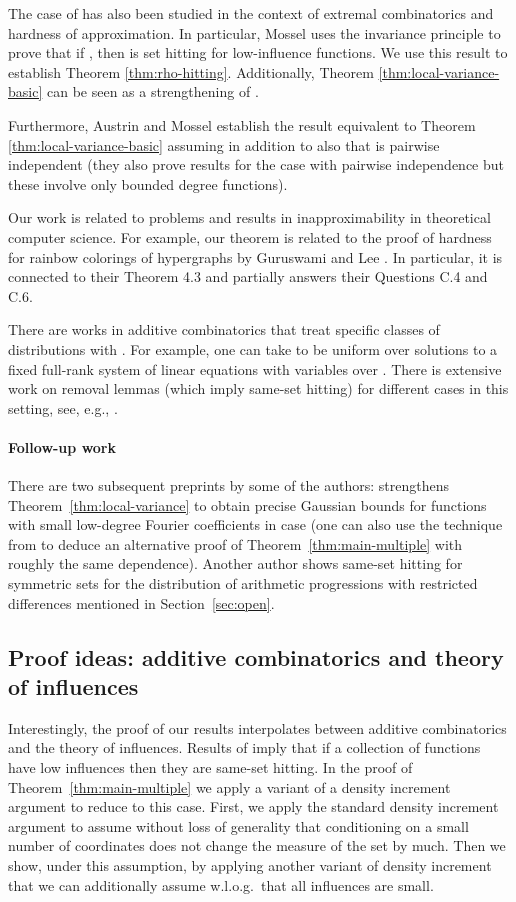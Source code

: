 \documentclass{daj}
\newcommand{\1}{\mathbbm{1}}
\theoremstyle{plain}
\theoremstyle{definition}
\begin{document}
The case of  has also been studied in the context of extremal 
combinatorics and hardness of approximation.
In particular, Mossel \cite{Mos10} uses the 
invariance principle to prove that if , then  is
set hitting for low-influence functions. We use this result to establish
Theorem \ref{thm:rho-hitting}. Additionally, Theorem 
\ref{thm:local-variance-basic} can be seen as a strengthening of
\cite{Mos10}.

Furthermore, Austrin and Mossel \cite{AM13} establish the result equivalent to 
Theorem \ref{thm:local-variance-basic} assuming in addition to 
also that  is pairwise independent (they also prove results for the case
 with pairwise independence but these involve only bounded degree 
functions).

Our work is related to problems and results in inapproximability in theoretical
computer science. 
For example, our theorem is related to the proof of hardness
for rainbow colorings of hypergraphs by Guruswami and Lee
\cite{GL15}. In particular, it is connected to their Theorem 4.3
and partially answers their Questions C.4 and C.6.

There are works in additive combinatorics that treat 
specific classes of distributions with . For example, one
can take  to be uniform over solutions to a fixed full-rank
system of  linear equations with  variables over .
There is extensive work on removal lemmas (which imply same-set hitting)
for different cases in this setting, see, e.g.,
\cite{Gre05a, KSV09, Sha10, FLS18}.

\paragraph{Follow-up work}
There are two subsequent preprints by some of the authors:
\cite{Mos17} strengthens Theorem~\ref{thm:local-variance} to obtain
precise Gaussian bounds for functions with small low-degree
Fourier coefficients in case  (one can also use the technique
from \cite{Mos17} to deduce an
alternative proof of Theorem~\ref{thm:main-multiple} with roughly
the same dependence).
Another author \cite{SymProg} shows
same-set hitting for symmetric sets for the distribution of
arithmetic progressions with restricted differences mentioned
in Section~\ref{sec:open}.


\subsection{Proof ideas: additive combinatorics and theory of influences}
Interestingly, the proof of our results interpolates between additive
combinatorics and the theory of influences. Results of \cite{Mos10} imply that
if a collection of functions have low influences then they are same-set
hitting. In the proof of Theorem~\ref{thm:main-multiple} we apply a variant of
a density increment argument to reduce to this case. First, we apply the standard
density increment argument to assume without loss of generality that
conditioning on a small number of coordinates does not change the measure of
the set by much. Then we show, under this assumption, by applying another variant
of density increment that we can additionally assume
w.l.o.g.~that all influences are small. 
\end{document}
